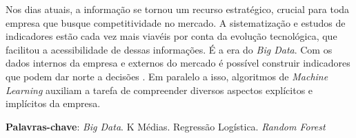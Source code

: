 \begin{resumo}
 
 Nos dias atuais, a informação se tornou um recurso estratégico, crucial para toda empresa que busque competitividade no mercado. A sistematização e estudos de indicadores estão cada vez mais viavéis por conta da evolução tecnológica, que facilitou a acessibilidade de dessas informações. É a era do \emph{Big Data}. Com os dados internos da empresa e externos do mercado é possível construir indicadores que podem dar norte a decisões . Em paralelo a isso, algoritmos de \emph{Machine Learning} auxiliam a tarefa de compreender diversos aspectos explícitos e implícitos da empresa.

 \textbf{Palavras-chave}: \emph{Big Data}. K Médias. Regressão Logística. \emph{Random Forest} 
\end{resumo}